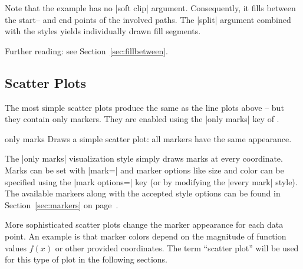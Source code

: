 {{\begin{codeexample}[]
\end{codeexample}
\noindent Note that the example has no |soft clip| argument. Consequently, it fills between the start-- and end points of the involved paths. The |split| argument combined with the styles yields individually drawn fill segments.


Further reading: see Section~\ref{sec:fillbetween}.
}


\subsection{Scatter Plots}
\label{sec:pgfplots:scatter:2d}
The most simple scatter plots produce the same as the line plots above -- but they contain only markers. They are enabled using the |only marks| key of \Tikz.
\begin{plottype}{only marks}
Draws a simple scatter plot: all markers have the same appearance.
\begin{codeexample}[]
\end{codeexample}
	The |only marks| visualization style simply draws marks at every coordinate. Marks can be set with |mark=| and marker options like size and color can be specified using the |mark options=| key (or by modifying the |every mark| style). The available markers along with the accepted style options can be found in Section~\ref{sec:markers} on page~\pageref{sec:markers}.
\end{plottype}

\label{pgfplots:scatter}
More sophisticated scatter plots change the marker appearance for each data point. An example is that marker colors depend on the magnitude of function values $f(x)$ or other provided coordinates. The term ``scatter plot'' will be used for this type of plot in the following sections.

}
